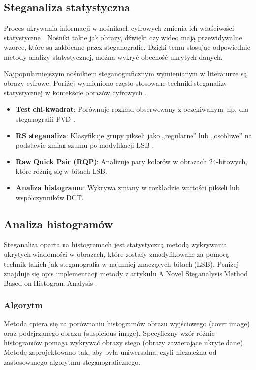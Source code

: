 \subsection{Steganaliza statystyczna}

Proces ukrywania informacji w nośnikach cyfrowych zmienia ich właściwości statystyczne \cite{stat_stego_study}. Nośniki takie jak
obrazy, dźwięki czy wideo mają przewidywalne wzorce, które są zakłócane przez steganografię. Dzięki temu
stosując odpowiednie metody analizy statystycznej, można wykryć obecność ukrytych danych.

Najpopularniejszym nośnikiem steganograficznym wymienianym w literaturze są obrazy cyfrowe. Poniżej wymieniono
często stosowane techniki steganalizy statystycznej w kontekście obrazów cyfrowych \cite{Michaylov23012024}.
\begin{itemize}
    \item \textbf{Test chi-kwadrat}: Porównuje rozkład obserwowany z oczekiwanym, np. dla steganografii PVD \cite{chisquare}.
    \item \textbf{RS steganaliza}: Klasyfikuje grupy pikseli jako „regularne” lub „osobliwe” na podstawie zmian szumu po modyfikacji LSB \cite{RS}.
    \item \textbf{Raw Quick Pair (RQP)}: Analizuje pary kolorów w obrazach 24-bitowych, które różnią się w bitach LSB.
    \item \textbf{Analiza histogramu}: Wykrywa zmiany w rozkładzie wartości pikseli lub współczynników DCT.
\end{itemize}

\subsection{Analiza histogramów}

Steganaliza oparta na histogramach jest statystyczną metodą wykrywania ukrytych wiadomości w obrazach,
które zostały zmodyfikowane za pomocą technik takich jak steganografia w najmniej znaczących bitach (LSB).
Poniżej znajduje się opis implementacji metody z artykułu A Novel Steganalysis Method Based
on Histogram Analysis \cite{histogram_steg}.

\subsubsection{Algorytm}

Metoda opiera się na porównaniu histogramów obrazu wyjściowego (cover image) oraz podejrzanego obrazu
(suspicious image). Specyficzny wzór różnic histogramów pomaga wykrywać obrazy stego (obrazy zawierające
ukryte dane). Metodę zaprojektowano tak, aby była uniwersalna, czyli niezależna od zastosowanego algorytmu
steganograficznego.

